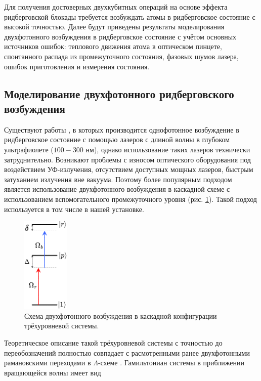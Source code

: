 Для получения достоверных двухкубитных операций на основе эффекта ридберговской блокады требуется возбуждать атомы в ридберговское состояние с высокой точностью. Далее будут приведены результаты моделирования двухфотонного возбуждения в ридберговское состояние с учётом основных источников ошибок: теплового движения атома в оптическом пинцете, спонтанного распада из промежуточного состояния, фазовых шумов лазера, ошибок приготовления и измерения состояния.


\subsection{Моделирование двухфотонного ридберговского возбуждения}

Существуют работы \cite{Srakaew:2023aa,Ma:2023aa,Madjarov:2020aa}, в которых производится однофотонное возбуждение в ридберговское состояние с помощью лазеров с длиной волны в глубоком ультрафиолете ($100-300$ нм), однако использование таких лазеров технически затруднительно. Возникают проблемы с износом оптического оборудования под воздействием УФ-излучения, отсутствием доступных мощных лазеров, быстрым затуханием излучения вне вакуума. Поэтому более популярным подходом является использование двухфотонного возбуждения в каскадной схеме с использованием вспомогательного промежуточного уровня (рис. \ref{fig:CascadeScheme}). Такой подход используется в том числе в нашей установке. 

\begin{figure}[ht]
	\centering
	\includegraphics[width=0.2\textwidth]{images/CascadeScheme.pdf}
	\caption{Схема двухфотонного возбуждения в каскадной конфигурации трёхуровневой системы.}
	\label{fig:CascadeScheme}
\end{figure}
	
Теоретическое описание такой трёхуровневой системы с точностью до переобозначений полностью совпадает с расмотренными ранее двухфотонными рамановскими переходами в $\Lambda$-схеме \cite{Steck,Lukin}. Гамильтониан системы в приближении вращающейся волны имеет вид 

